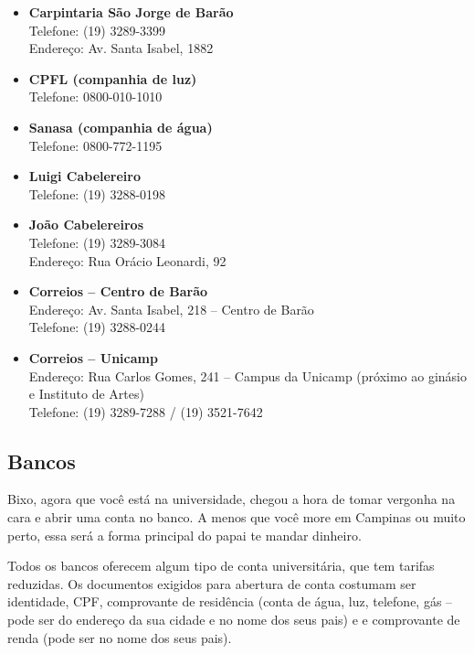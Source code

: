 \begin{itemize}
    \item  \textbf{Carpintaria São Jorge de Barão}
        \\Telefone: (19) 3289-3399
        \\Endereço: Av. Santa Isabel, 1882

    \item  \textbf{CPFL (companhia de luz)}
        \\Telefone: 0800-010-1010

    \item  \textbf{Sanasa (companhia de água)}
        \\Telefone: 0800-772-1195

    \item  \textbf{Luigi Cabelereiro}
        \\Telefone: (19) 3288-0198

    \item  \textbf{João Cabelereiros}
        \\Telefone: (19) 3289-3084
        \\Endereço: Rua Orácio Leonardi, 92

    \item  \textbf{Correios -- Centro de Barão}
        \\Endereço: Av. Santa Isabel, 218 -- Centro de Barão
        \\Telefone: (19) 3288-0244

    \item  \textbf{Correios -- Unicamp}
        \\Endereço: Rua Carlos Gomes, 241 -- Campus da Unicamp (próximo ao ginásio e Instituto de Artes)
        \\Telefone: (19) 3289-7288 / (19) 3521-7642
\end{itemize}

\subsection{Bancos}

Bixo, agora que você está na universidade, chegou a hora de tomar vergonha na
cara e abrir uma conta no banco. A menos que você more em Campinas ou muito
perto, essa será a forma principal do papai te mandar dinheiro.

Todos os bancos oferecem algum tipo de conta universitária, que tem tarifas
reduzidas. Os documentos exigidos para abertura de conta costumam ser
identidade, CPF, comprovante de residência (conta de água, luz, telefone, gás --
pode ser do endereço da sua cidade e no nome dos seus pais) e e comprovante de
renda (pode ser no nome dos seus pais).

